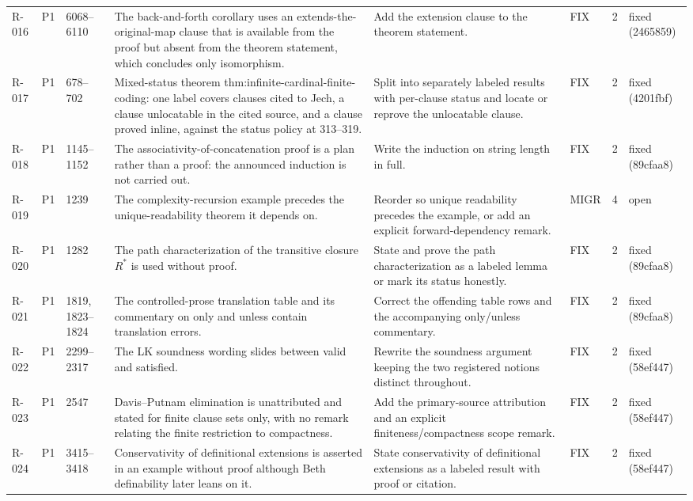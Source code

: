 \begin{longtable}{@{}p{0.45in}p{0.25in}p{0.7in}p{2.2in}p{1.75in}p{0.45in}p{0.16in}p{0.34in}@{}}
R-016 & P1 & 6068--6110 & The back-and-forth corollary uses an extends-the-original-map clause that is available from the proof but absent from the theorem statement, which concludes only isomorphism. & Add the extension clause to the theorem statement. & FIX & 2 & fixed (2465859) \\
R-017 & P1 & 678--702 & Mixed-status theorem thm:infinite-cardinal-finite-coding: one label covers clauses cited to Jech, a clause unlocatable in the cited source, and a clause proved inline, against the status policy at 313--319. & Split into separately labeled results with per-clause status and locate or reprove the unlocatable clause. & FIX & 2 & fixed (4201fbf) \\
R-018 & P1 & 1145--1152 & The associativity-of-concatenation proof is a plan rather than a proof: the announced induction is not carried out. & Write the induction on string length in full. & FIX & 2 & fixed (89cfaa8) \\
R-019 & P1 & 1239 & The complexity-recursion example precedes the unique-readability theorem it depends on. & Reorder so unique readability precedes the example, or add an explicit forward-dependency remark. & MIGR & 4 & open \\
R-020 & P1 & 1282 & The path characterization of the transitive closure \(R^*\) is used without proof. & State and prove the path characterization as a labeled lemma or mark its status honestly. & FIX & 2 & fixed (89cfaa8) \\
R-021 & P1 & 1819, 1823--1824 & The controlled-prose translation table and its commentary on only and unless contain translation errors. & Correct the offending table rows and the accompanying only/unless commentary. & FIX & 2 & fixed (89cfaa8) \\
R-022 & P1 & 2299--2317 & The LK soundness wording slides between valid and satisfied. & Rewrite the soundness argument keeping the two registered notions distinct throughout. & FIX & 2 & fixed (58ef447) \\
R-023 & P1 & 2547 & Davis--Putnam elimination is unattributed and stated for finite clause sets only, with no remark relating the finite restriction to compactness. & Add the primary-source attribution and an explicit finiteness/compactness scope remark. & FIX & 2 & fixed (58ef447) \\
R-024 & P1 & 3415--3418 & Conservativity of definitional extensions is asserted in an example without proof although Beth definability later leans on it. & State conservativity of definitional extensions as a labeled result with proof or citation. & FIX & 2 & fixed (58ef447) \\

\end{longtable}
